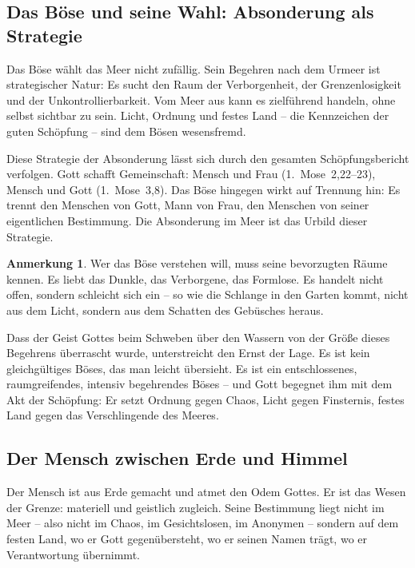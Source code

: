 ﻿\documentclass[a4paper,12pt]{article}
\theoremstyle{definition}
\newtheorem{remark}{Anmerkung}[section]
\begin{document}
\subsection{Das Böse und seine Wahl: Absonderung als Strategie}

Das Böse wählt das Meer nicht zufällig. Sein Begehren nach dem Urmeer ist
strategischer Natur: Es sucht den Raum der Verborgenheit, der Grenzenlosigkeit
und der Unkontrollierbarkeit. Vom Meer aus kann es zielführend handeln, ohne
selbst sichtbar zu sein. Licht, Ordnung und festes Land -- die Kennzeichen der
guten Schöpfung -- sind dem Bösen wesensfremd.

Diese Strategie der Absonderung lässt sich durch den gesamten Schöpfungsbericht
verfolgen. Gott schafft Gemeinschaft: Mensch und Frau (1.~Mose~2,22--23), Mensch
und Gott (1.~Mose~3,8). Das Böse hingegen wirkt auf Trennung hin: Es trennt den
Menschen von Gott, Mann von Frau, den Menschen von seiner eigentlichen Bestimmung.
Die Absonderung im Meer ist das Urbild dieser Strategie.

\begin{remark}
    Wer das Böse verstehen will, muss seine bevorzugten Räume kennen. Es liebt
    das Dunkle, das Verborgene, das Formlose. Es handelt nicht offen, sondern
    schleicht sich ein -- so wie die Schlange in den Garten kommt, nicht aus dem
    Licht, sondern aus dem Schatten des Gebüsches heraus.
\end{remark}

Dass der Geist Gottes beim Schweben über den Wassern von der Größe dieses
Begehrens überrascht wurde, unterstreicht den Ernst der Lage. Es ist kein
gleichgültiges Böses, das man leicht übersieht. Es ist ein entschlossenes,
raumgreifendes, intensiv begehrendes Böses -- und Gott begegnet ihm mit dem
Akt der Schöpfung: Er setzt Ordnung gegen Chaos, Licht gegen Finsternis, festes
Land gegen das Verschlingende des Meeres.

\subsection{Der Mensch zwischen Erde und Himmel}

Der Mensch ist aus Erde gemacht und atmet den Odem Gottes. Er ist das Wesen der
Grenze: materiell und geistlich zugleich. Seine Bestimmung liegt nicht im Meer --
also nicht im Chaos, im Gesichtslosen, im Anonymen -- sondern auf dem festen Land,
wo er Gott gegenübersteht, wo er seinen Namen trägt, wo er Verantwortung übernimmt.
\end{document}
